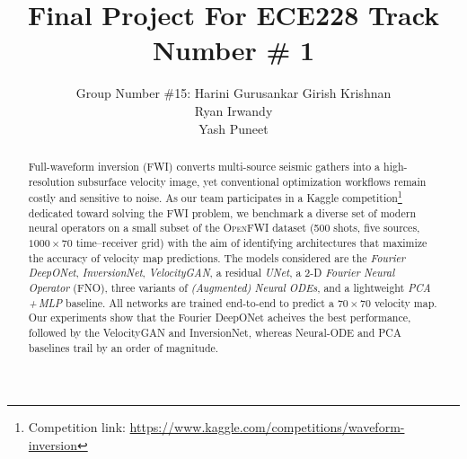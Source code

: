 \documentclass{article}
\title{Final Project For ECE228 Track Number \# 1}
\author{%
  Group Number \#15: Harini Gurusankar
  \And
  Girish Krishnan \\
  \AND
  Ryan Irwandy  \\
  \And
  Yash Puneet \\
}
\begin{document}
\maketitle

\begin{abstract}
    Full-waveform inversion (FWI) converts multi-source seismic gathers into a high-resolution subsurface velocity image, yet conventional optimization workflows remain costly and sensitive to noise.  
    As our team participates in a Kaggle competition\footnote{Competition link: \url{https://www.kaggle.com/competitions/waveform-inversion}}   dedicated toward solving the FWI problem, we benchmark a diverse set of modern neural operators on a small subset of the \textsc{OpenFWI} dataset (500 shots, five sources, $1000\times70$ time–receiver grid) with the aim of identifying architectures that maximize the accuracy of velocity map predictions.
    The models considered are the \emph{Fourier DeepONet}, \emph{InversionNet}, \emph{VelocityGAN}, a residual \emph{UNet}, a 2-D \emph{Fourier Neural Operator} (FNO), three variants of \emph{(Augmented) Neural ODEs}, and a lightweight \emph{PCA\,{+}\,MLP} baseline.  
    All networks are trained end-to-end to predict a $70\times70$ velocity map. Our experiments show that the Fourier DeepONet acheives the best performance, followed by the VelocityGAN and InversionNet, whereas Neural-ODE and PCA baselines trail by an order of magnitude. 
\end{abstract}


\end{document}
